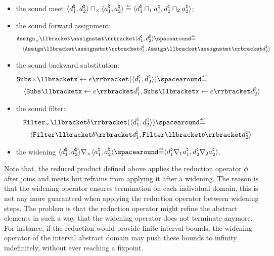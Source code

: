 \begin{definition}
\begin{itemize}
  \item the sound meet $\tuple{\defabstractvalue_1}{\defabstractvalue_2} \productdomainmeet \tuple{\defotherabstractvalue_1}{\defotherabstractvalue_2} \defeq \tuple{\defabstractvalue_1 \abstractdomainmeet_1 \defotherabstractvalue_1}{\defabstractvalue_2 \abstractdomainmeet_2 \defotherabstractvalue_2}$;
  \item the sound forward assignment:
  \begin{align*}
    &\productdomainassign\semanticsof{\assignstmt}\tuple{\defabstractvalue_1}{\defabstractvalue_2} \DefeQ \\
    &\quad \tuple{\abstractdomainassign\semanticsof{\assignstmt}\defabstractvalue_1}{\abstractdomainassign\semanticsof{\assignstmt}\defabstractvalue_2}
  \end{align*}
  \item the sound backward substitution:
  \begin{align*}
    &\productdomainsubsitute\substitutionof{\defvariable}{\defaexp}(\tuple{\defabstractvalue_1}{\defabstractvalue_2}) \DefeQ \\
    &\quad \tuple{\abstractdomainsubstitute{\defvariable}{\defaexp}\defabstractvalue_1}{\abstractdomainsubstitute{\defvariable}{\defaexp}\defabstractvalue_2}
  \end{align*}
  \item the sound filter:
  \begin{align*}
    &\productdomainfilter\semanticsof{\defbexp}(\tuple{\defabstractvalue_1}{\defabstractvalue_2}) \DefeQ \\
    &\quad \tuple{\abstractdomainfilter\semanticsof{\defbexp}\defabstractvalue_1}{\abstractdomainfilter\semanticsof{\defbexp}\defabstractvalue_2}
  \end{align*}
  \item the widening $\tuple{\defabstractvalue_1}{\defabstractvalue_2} \productdomainwidening \tuple{\defotherabstractvalue_1}{\defotherabstractvalue_2} \DefeQ \tuple{\defabstractvalue_1 \abstractdomainwidening_1 \defotherabstractvalue_1}{\defabstractvalue_2 \abstractdomainwidening_2 \defotherabstractvalue_2}$.
\end{itemize}
\end{definition}

Note that, the reduced product defined above applies the reduction operator $\phi$ after joins and meets but refrains from applying it after a widening. The reason is that the widening operator ensures termination on each individual domain, this is not any more guaranteed when applying the reduction operator between widening steps. The problem is that the reduction operator might refine the abstract elements in such a way that the widening operator does not terminate anymore. For instance, if the reduction would provide finite interval bounds, the widening operator of the interval abstract domain may push these bounds to infinity indefinitely, without ever reaching a fixpoint.

